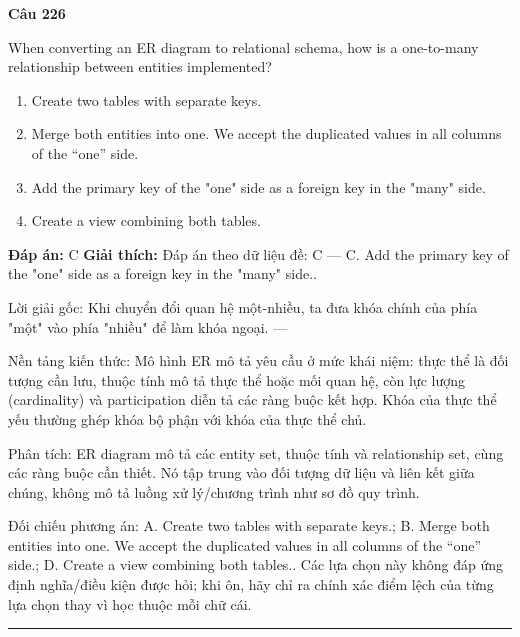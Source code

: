 \documentclass[11pt,a4paper]{article}
\newenvironment{question}[1]{%
  \par\vspace{1em}\noindent\textbf{\large Câu #1}\par\vspace{0.4em}
}{%
  \par\vspace{1em}\hrule\vspace{0.6em}
}
\newenvironment{choices}{%
  \begin{enumerate}[label=\textbf{\Alph*.},leftmargin=2.2em,itemsep=2pt,topsep=3pt]
}{%
  \end{enumerate}
}
\newcommand{\choice}{\item}
\begin{document}
\begin{question}{226}
When converting an ER diagram to relational schema, how is a one-to-many relationship between entities implemented?
\begin{choices}
\choice Create two tables with separate keys.
\choice Merge both entities into one. We accept the duplicated values in all columns of the “one” side.
\choice Add the primary key of the "one" side as a foreign key in the "many" side.
\choice Create a view combining both tables.
\end{choices}
\textbf{Đáp án:} C
\textbf{Giải thích:} Đáp án theo dữ liệu đề: C — C. Add the primary key of the "one" side as a foreign key in the "many" side..

Lời giải gốc: Khi chuyển đổi quan hệ một-nhiều, ta đưa khóa chính của phía "một" vào phía "nhiều" để làm khóa ngoại. ---

Nền tảng kiến thức: Mô hình ER mô tả yêu cầu ở mức khái niệm: thực thể là đối tượng cần lưu, thuộc tính mô tả thực thể hoặc mối quan hệ, còn lực lượng (cardinality) và participation diễn tả các ràng buộc kết hợp. Khóa của thực thể yếu thường ghép khóa bộ phận với khóa của thực thể chủ.

Phân tích: ER diagram mô tả các entity set, thuộc tính và relationship set, cùng các ràng buộc cần thiết. Nó tập trung vào đối tượng dữ liệu và liên kết giữa chúng, không mô tả luồng xử lý/chương trình như sơ đồ quy trình.

Đối chiếu phương án: A. Create two tables with separate keys.; B. Merge both entities into one. We accept the duplicated values in all columns of the “one” side.; D. Create a view combining both tables.. Các lựa chọn này không đáp ứng định nghĩa/điều kiện được hỏi; khi ôn, hãy chỉ ra chính xác điểm lệch của từng lựa chọn thay vì học thuộc mỗi chữ cái.
\end{question}
\end{document}
